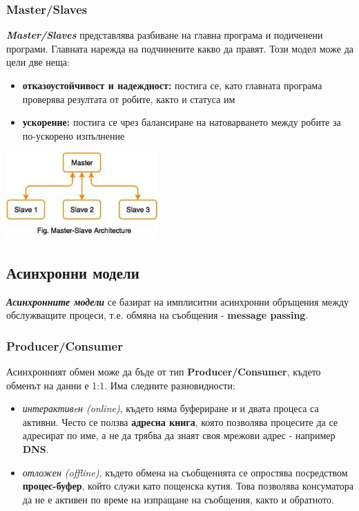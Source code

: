 \documentclass[fleqn,12pt]{article}
\begin{document}
\subsubsection{Master/Slaves}
\textbf{\textit{Master/Slaves}} представлява разбиване на главна програма и подиченени програми.
Главната нарежда на подчинените какво да правят. Този модел може да цели две неща:
\begin{itemize}
    \item \textbf{отказоустойчивост и надеждност:} постига се, като главната програма проверява резултата от робите, както и статуса им
    \item \textbf{ускорение:} постига се чрез балансиране на натоварването между робите за по-ускорено изпълнение
\end{itemize}


\begin{center} \includegraphics[width=220px]{master_slave.jpg} \end{center}

\subsection{Асинхронни модели}

\textbf{\textit{Асинхронните модели}} се базират на имплиситни асинхронни обръщения между обслужващите процеси,
т.е. обмяна на съобщения - \textbf{message passing}.

\subsubsection{Producer/Consumer}
Асинхронният обмен може да бъде от тип \textbf{Producer/Consumer}, където обменът на данни е 1:1.
Има следните разновидности:
\begin{itemize}
    \item \textit{интерактивeн (online)}, където няма буфериране и и двата процеса са активни.
    Често се ползва \textbf{адресна книга}, която позволява процесите да се адресират по име, 
    а не да трябва да знаят своя мрежови адрес - например \textbf{DNS}. 
    \item \textit{отложен (offline)}, където обмена на съобщенията се опростява посредством \textbf{процес-буфер},
    който служи като пощенска кутия. 
    Това позволява консуматора да не е активен по време на изпращане на съобщения, както и обратното.
\end{itemize}
\end{document}
